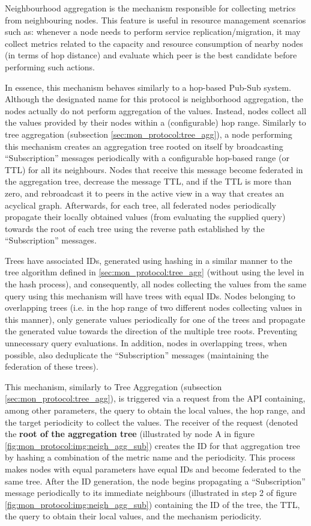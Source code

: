 Neighbourhood aggregation is the mechanism responsible for collecting metrics from neighbouring nodes. This feature is useful in resource management scenarios such as: whenever a node needs to perform service replication/migration, it may collect metrics related to the capacity and resource consumption of nearby nodes (in terms of hop distance) and evaluate which peer is the best candidate before performing such actions. 

In essence, this mechanism behaves similarly to a hop-based Pub-Sub system. Although the designated name for this protocol is neighborhood aggregation, the nodes actually do not perform aggregation of the values. Instead, nodes collect all the values provided by their nodes within a (configurable) hop range. Similarly to tree aggregation (subsection \ref{sec:mon_protocol:tree_agg}), a node performing this mechanism creates an aggregation tree rooted on itself by broadcasting ``Subscription'' messages periodically with a configurable hop-based range (or TTL) for all its neighbours. Nodes that receive this message become federated in the aggregation tree, decrease the message TTL, and if the TTL is more than zero, and rebroadcast it to peers in the active view in a way that creates an acyclical graph. Afterwards, for each tree, all federated nodes periodically propagate their locally obtained values (from evaluating the supplied query) towards the root of each tree using the reverse path established by the ``Subscription'' messages. 

Trees have associated IDs, generated using hashing in a similar manner to the tree algorithm defined in \ref{sec:mon_protocol:tree_agg} (without using the level in the hash process), and consequently, all nodes collecting the values from the same query using this mechanism will have trees with equal IDs. Nodes belonging to overlapping trees (i.e. in the hop range of two different nodes collecting values in this manner), only generate values periodically for one of the trees and propagate the generated value towards the direction of the multiple tree roots. Preventing unnecessary query evaluations. In addition, nodes in overlapping trees, when possible, also deduplicate the ``Subscription'' messages (maintaining the federation of these trees).

This mechanism, similarly to Tree Aggregation (subsection \ref{sec:mon_protocol:tree_agg}), is triggered via a request from the API containing, among other parameters, the query to obtain the local values, the hop range, and the target periodicity to collect the values. The receiver of the request (denoted the \textbf{root of the aggregation tree} (illustrated by node A in figure \ref{fig:mon_protocol:img:neigh_agg_sub}) creates the ID for that aggregation tree by hashing a combination of the metric name and the periodicity. This process makes nodes with equal parameters have equal IDs and become federated to the same tree. After the ID generation, the node begins propagating a ``Subscription'' message periodically to its immediate neighbours (illustrated in step 2 of figure \ref{fig:mon_protocol:img:neigh_agg_sub}) containing the ID of the tree, the TTL, the query to obtain their local values, and the mechanism periodicity. 

